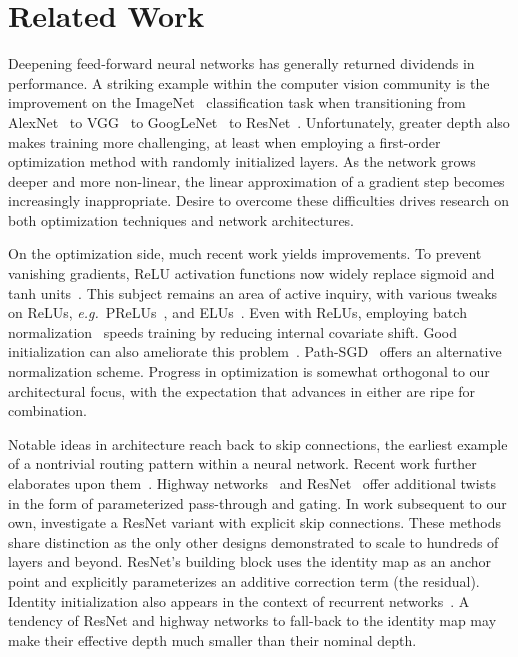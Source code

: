 \documentclass{article}
\def\eg{\emph{e.g.}}
\newcommand{\resnet}{ResNet}
\newcommand{\Resnet}{ResNet}
\begin{document}
\section{Related Work}
\label{sec:related}
Deepening feed-forward neural networks has generally returned dividends in
performance.  A striking example within the computer vision community is the
improvement on the ImageNet~\citep{deng2009imagenet} classification task when
transitioning from AlexNet~\citep{alexNet12} to VGG~\citep{vgg16} to
GoogLeNet~\citep{szegedy2015inception} to {\resnet}~\citep{he2015deep}.
Unfortunately, greater depth also makes training more challenging, at least
when employing a first-order optimization method with randomly initialized
layers.  As the network grows deeper and more non-linear, the linear
approximation of a gradient step becomes increasingly inappropriate.  Desire
to overcome these difficulties drives research on both optimization techniques
and network architectures.

On the optimization side, much recent work yields improvements.  To prevent
vanishing gradients, ReLU activation functions now widely replace sigmoid and
tanh units~\citep{nair2010rectified}.  This subject remains an area of active
inquiry, with various tweaks on ReLUs, \eg~PReLUs~\citep{he2015prelu}, and
ELUs~\citep{elu}.  Even with ReLUs, employing batch normalization~\citep{
batchnorm} speeds training by reducing internal covariate shift.  Good
initialization can also ameliorate this problem~\citep{glorot2010understanding,
mishkin2015all}.  Path-SGD~\citep{pathsgd} offers an alternative normalization
scheme.  Progress in optimization is somewhat orthogonal to our architectural
focus, with the expectation that advances in either are ripe for combination.

Notable ideas in architecture reach back to skip connections, the earliest
example of a nontrivial routing pattern within a neural network.  Recent work
further elaborates upon them~\citep{MYP:ACCV:2014,HAGM:CVPR:2015}.  Highway
networks~\citep{srivastava2015highway} and {\resnet}~\citep{he2015deep,
he2016identity} offer additional twists in the form of parameterized
pass-through and gating.  In work subsequent to our own, \cite{densenet}
investigate a {\resnet} variant with explicit skip connections.  These methods
share distinction as the only other designs demonstrated to scale to hundreds
of layers and beyond.  {\Resnet}'s building block uses the identity map as an
anchor point and explicitly parameterizes an additive correction term (the
residual).  Identity initialization also appears in the context of recurrent
networks~\citep{le2015simple}.  A tendency of {\resnet} and highway networks to
fall-back to the identity map may make their effective depth much smaller than
their nominal depth.
\end{document}
